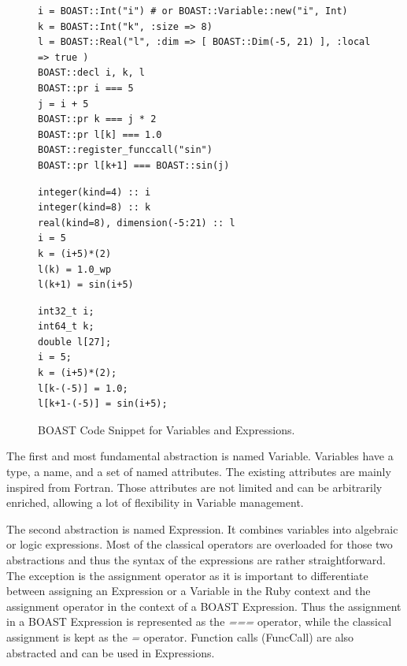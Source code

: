 \documentclass{IEEEtran}
\begin{document}
\begin{figure}
\begin{lstlisting}
i = BOAST::Int("i") # or BOAST::Variable::new("i", Int)
k = BOAST::Int("k", :size => 8)
l = BOAST::Real("l", :dim => [ BOAST::Dim(-5, 21) ], :local => true )
BOAST::decl i, k, l
BOAST::pr i === 5
j = i + 5
BOAST::pr k === j * 2
BOAST::pr l[k] === 1.0
BOAST::register_funccall("sin")
BOAST::pr l[k+1] === BOAST::sin(j)
\end{lstlisting}

\begin{minipage}[b]{0.5\linewidth}
\centering
{}

\begin{lstlisting}
integer(kind=4) :: i
integer(kind=8) :: k
real(kind=8), dimension(-5:21) :: l
i = 5
k = (i+5)*(2)
l(k) = 1.0_wp
l(k+1) = sin(i+5)
\end{lstlisting}
\end{minipage}
\hspace{0.08\linewidth}
\begin{minipage}[b]{0.40\linewidth}
\centering
{}

\begin{lstlisting}
int32_t i;
int64_t k;
double l[27];
i = 5;
k = (i+5)*(2);
l[k-(-5)] = 1.0;
l[k+1-(-5)] = sin(i+5);
\end{lstlisting}
\end{minipage}
\caption{BOAST Code Snippet for Variables and Expressions.}
\label{fig:BOAST_algebra}
\end{figure}
The first and most fundamental abstraction is named Variable. Variables have a
type, a name, and a set of named attributes. The existing attributes are mainly
inspired from Fortran. Those attributes are not limited and can be arbitrarily
enriched, allowing a lot of flexibility in Variable management.

The second abstraction is named Expression. It combines variables into
algebraic or logic expressions. Most of the classical operators are overloaded
for those two abstractions and thus the syntax of the expressions are rather
straightforward. The exception is the assignment operator as it is important to
differentiate between assigning an Expression or a Variable in the Ruby context
and the assignment operator in the context of a BOAST Expression. Thus the
assignment in a BOAST Expression is represented as the \emph{===} operator,
while the classical assignment is kept as the \emph{=} operator. Function calls
(FuncCall) are also abstracted and can be used in Expressions.
\end{document}
